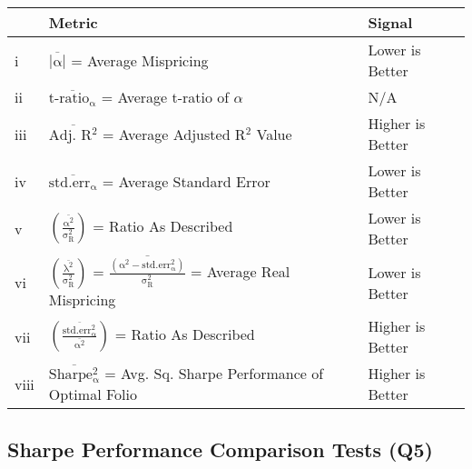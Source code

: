 \documentclass[11pt, english]{article}
\begin{document}
\begin{table}[h]
        \scriptsize
	\renewcommand{\arraystretch}{1.25}
\begin{center}
\begin{tabular}{p{1cm}p{8cm}p{2.5cm}}
        & \textbf{Metric} & \textbf{Signal} \\
        \hline
        i & $\mathrm{\overline{|\alpha|}}$ = Average Mispricing & Lower is Better\\
        ii & $\mathrm{\overline{\textrm{t-ratio}_{\alpha}}}$ = Average t-ratio of $\alpha$ & N/A\\
        iii & $\overline{\textrm{Adj. R}\mathrm{^2}}$ = Average Adjusted R$^2$ Value & Higher is Better\\
        iv & $\overline{\mathrm{std.err_{\alpha}}}$ = Average Standard Error & Lower is Better\\
	v & $\mathrm{\left(\frac{\overline{\alpha^2}}{\sigma_R^2}\right)}$ = Ratio As Described & Lower is Better\\
	vi & $\mathrm{\left(\frac{\overline{\lambda^2}}{\sigma_R^2}\right)}$ = $\mathrm{\overline{\frac{\left(\alpha^2-std.err_{\alpha}^2\right)}{\sigma_R^2}}}$ = Average Real Mispricing & Lower is Better\\
	vii & $\mathrm{\left(\frac{\overline{std.err_{\alpha}^2}}{\overline{\alpha^2}}\right)}$ = Ratio As Described & Higher is Better\\ 
        viii & $\overline{\mathrm{Sharpe_{\alpha}^2}}$ = Avg. Sq. Sharpe Performance of Optimal Folio & Higher is Better\\
        \hline
\end{tabular}
\end{center}
\end{table}

\newpage

	\subsection{Sharpe Performance Comparison Tests (Q5)}
\end{document}
